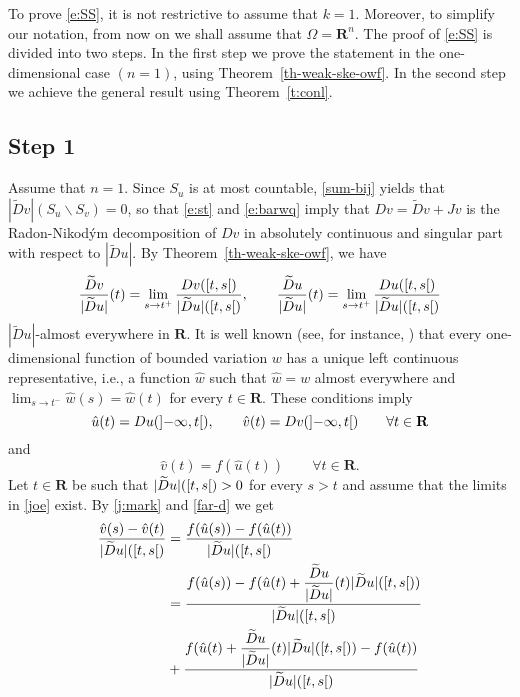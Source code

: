 \documentclass[draft]{amsart}
\theoremstyle{definition}
\theoremstyle{remark}
\newcommand{\thmref}[1]{Theorem~\ref{#1}}
\newcommand{\interval}[1]{\mathinner{#1}}
\begin{document}
To prove \eqref{e:SS}, it is not restrictive to assume that $k=1$. Moreover,
to simplify our notation, from now on we shall assume that $\Omega =
\mathbf{R}^n$. The proof of \eqref{e:SS} is divided into two steps.
In the first step we
prove the statement in the one-dimensional case $(n=1)$, using
\thmref{th-weak-ske-owf}.
In the second step we achieve the general result using
\thmref{t:conl}.

\subsection*{Step 1}
Assume that $n=1$. Since $S_u$ is at most countable,
\eqref{sum-bij}
yields that $|\widetilde{D}v|(S_u\backslash S_v)=0$, so that
\eqref{e:st} and \eqref{e:barwq}
imply that $Dv=\widetilde{D}v+Jv$ is the Radon-Nikod\'ym decomposition of
$Dv$ in absolutely continuous and singular part with respect to $|\widetilde{D}
u|$. By \thmref{th-weak-ske-owf}, we have
\begin{equation*}
\frac{\widetilde{D}v}{|\widetilde{D}u|}(t)=\lim_{s\to t^+}
\frac{Dv(\interval{\left[t,s\right[})}
{|\widetilde{D}u|(\interval{\left[t,s\right[})},\qquad
\frac{\widetilde{D}u}{|\widetilde{D}u|}(t)=\lim_{s\to t^+}
\frac{Du(\interval{\left[t,s\right[})}
{|\widetilde{D}u|(\interval{\left[t,s\right[})}
\end{equation*}
$|\widetilde{D}u|$-almost everywhere in $\mathbf{R}$. It is well known
(see, for instance, \cite[2.5.16]{ste:sint}) that every one-dimensional
function of bounded variation $w$ has a unique left continuous
representative, i.e., a function $\hat w$ such that $\hat w=w$ almost
everywhere and $\lim_{s\to t^-}\hat w(s)=\hat w(t)$ for every $t\in
\mathbf{R}$. These conditions imply
\begin{equation}
\hat u(t)=Du(\interval{\left]-\infty,t\right[}),
\qquad \hat v(t)=Dv(\interval{\left]-\infty,t\right[})\qquad
\forall t\in\mathbf{R}
\end{equation}
and
\begin{equation}\label{alimo}
\hat v(t)=f(\hat u(t))\qquad\forall t\in\mathbf{R}.\end{equation}
Let $t\in\mathbf{R}$ be such that
$|\widetilde{D}u|(\interval{\left[t,s\right[})>0$ for every $s>t$ and
assume that the limits in \eqref{joe} exist. By \eqref{j:mark} and
\eqref{far-d} we get
\begin{equation*}\begin{split}
\frac{\hat v(s)-\hat
v(t)}{|\widetilde{D}u|(\interval{\left[t,s\right[})}&=\frac {f(\hat
u(s))-f(\hat u(t))}{|\widetilde{D}u|(\interval{\left[t,s\right[})}\\
&=\frac{f(\hat u(s))-f(\hat
u(t)+\dfrac{\widetilde{D}u}{|\widetilde{D}u|}(t)|\widetilde{D}u
|(\interval{\left[t,s\right[}))}%
{|\widetilde{D}u|(\interval{\left[t,s\right[})}\\
&+\frac
{f(\hat u(t)+\dfrac{\widetilde{D}u}{|\widetilde{D}u|}(t)|\widetilde{D}
u|(\interval{\left[t,s\right[}))-f(\hat
u(t))}{|\widetilde{D}u|(\interval{\left[t,s\right[})}
\end{split}\end{equation*}
\end{document}
